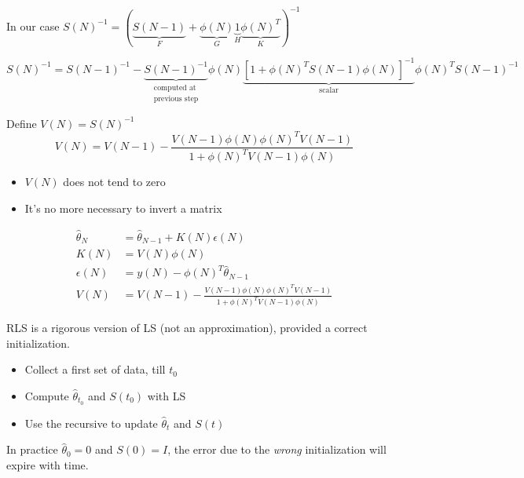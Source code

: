 In our case $S(N)^{-1} = (\underbrace{S(N-1)}_F + \underbrace{\phi(N)}_G \underbrace{1}_H \underbrace{\phi(N)^T}_K )^{-1}$

\[
    S(N)^{-1} = S(N-1)^{-1} - \underbrace{S(N-1)^{-1}}_{\substack{\text{computed at}\\\text{previous step}}}\phi(N)\underbrace{\left[1 + \phi(N)^TS(N-1)\phi(N) \right]^{-1}}_\text{scalar}\phi(N)^TS(N-1)^{-1}
\]

Define $V(N) = S(N)^{-1}$
\[
    V(N) = V(N-1) - \frac{V(N-1)\phi(N)\phi(N)^TV(N-1)}{1+\phi(N)^TV(N-1)\phi(N)}
\]
\begin{itemize}
    \item $V(N)$ does not tend to zero
    \item It's no more necessary to invert a matrix
\end{itemize}

\begin{align*}
    \hat{\theta}_N &= \hat{\theta}_{N-1} + K(N)\epsilon(N) \\
    K(N) &= V(N)\phi(N) \\
    \epsilon(N) &= y(N) - \phi(N)^T\hat{\theta}_{N-1} \\
    V(N) &= V(N-1) - \frac{V(N-1)\phi(N)\phi(N)^TV(N-1)}{1+\phi(N)^TV(N-1)\phi(N)}
\end{align*}

\begin{rem}
    RLS is a rigorous version of LS (not an approximation), provided a correct initialization.

    \begin{figure}[H]
        \centering
    \end{figure}

    \begin{itemize}
        \item Collect a first set of data, till $t_0$
        \item Compute $\hat{\theta}_{t_0}$ and $S(t_0)$ with LS
        \item Use the recursive to update $\hat{\theta}_t$ and $S(t)$
    \end{itemize}

    In practice $\hat{\theta}_0 = 0$ and $S(0) = I$, the error due to the \emph{wrong} initialization will expire with time.
\end{rem}

